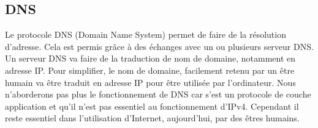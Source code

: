\subsection{DNS}
Le protocole DNS (Domain Name System) permet de faire de la résolution
d'adresse.  Cela est permis grâce à des échanges avec un ou plusieurs serveur DNS.
Un serveur DNS va faire de la traduction de nom de domaine, notamment en adresse IP. Pour
simplifier, le nom de domaine, facilement retenu par un être humain va être
traduit en adresse IP pour être utilisée par l'ordinateur.  Nous n'aborderons
pas plus le fonctionnement de DNS car s'est un protocole de couche application
et qu'il n'est pas essentiel au fonctionnement d'IPv4. Cependant il reste
essentiel dans l'utilisation d'Internet, aujourd'hui, par des êtres humains.
